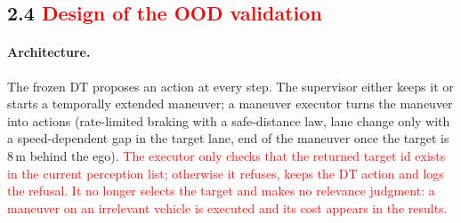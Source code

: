 \documentclass[11pt]{article}
\newcommand{\rev}[1]{\textcolor{red}{#1}}
\begin{document}
\subsection*{2.4 \rev{Design of the OOD validation}}

\paragraph{Architecture.} The frozen DT proposes an action at every step. The supervisor either keeps it or starts a
temporally extended maneuver; a maneuver executor turns the maneuver into actions (rate-limited braking with a
safe-distance law, lane change only with a speed-dependent gap in the target lane, end of the maneuver once the target
is 8\,m behind the ego). \rev{The executor only checks that the returned target id exists in the current perception
list; otherwise it refuses, keeps the DT action and logs the refusal. It no longer selects the target and makes no
relevance judgment: a maneuver on an irrelevant vehicle is executed and its cost appears in the results.}
\end{document}
